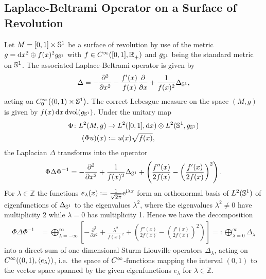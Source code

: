 \subsection{Laplace-Beltrami Operator on a Surface of Revolution}
\label{sec:laplace-beltrami}
Let $M = [0,1]\times\Sphere{1}$ be a surface of revolution by use of the metric
$g = \mathrm dx^2 \oplus f(x)^2 g_\Sphere{1}$ with $f\in \Cinf([0,1], \Rplus)$
and $g_\Sphere1$ being the standard metric on $\Sphere1$. The associated
Laplace-Beltrami operator is given by
\begin{align}
  \Delta = -\frac{\partial^2}{\partial x^2} -
            \frac{f'(x)}{f(x)}\frac{\partial}{\partial x} +
            \frac{1}{f(x)^2}\Delta_\Sphere1,
  \label{eqn:laplace}
\end{align}
acting on $\Cinf[0]\bigl((0,1)\times\Sphere1\bigr)$. The correct Lebesgue
measure on the space $(M,g)$ is given by $f(x)\,\mathrm dx\, \mathrm
d\!\vol(g_\Sphere1)$. Under the unitary map
\begin{align*}
  \Phi\colon L^2(M, g)&\to L^2([0,1], \mathrm dx)\otimes L^2(\Sphere1,
  g_\Sphere1) \\ (\Phi u)(x) &:= u(x) \sqrt{f(x)},
\end{align*}
the Laplacian $\Delta$ transforms into the operator
\begin{align*}
  \Phi\Delta\Phi^{-1} = -\frac{\partial^2}{\partial x^2} +
  \frac{1}{f(x)^2}\Delta_\Sphere1 + \left( \frac{f''(x)}{2f(x)} -
  \left(\frac{f'(x)}{2f(x)}\right)^2\right).
\end{align*}
For $\lambda\in\mathbb{Z}$ the functions $e_\lambda(x) :=
\frac{1}{\sqrt{2\pi}}\Eto{\mathrm i\lambda x}$ form an orthonormal basis of
$L^2(\Sphere1)$ of eigenfunctions of $\Delta_\Sphere1$ to the eigenvalues
$\lambda^2$, where the eigenvalues $\lambda^2 \neq 0$ have multiplicity 2 while
$\lambda = 0$ has multiplicity 1. Hence we have the decomposition
\begin{align}
  \label{eqn:lpl-decomp}
  \Phi\Delta\Phi^{-1} &= \bigoplus_{\lambda=-\infty}^{\infty} \left[
    -\frac{\partial^2}{\partial x^2} + \frac{\lambda^2}{f(x)^2} + 
     \left( \frac{f''(x)}{2f(x)} -
   \left(\frac{f'(x)}{2f(x)}\right)^2\right)\right]
     =: \bigoplus_{\lambda=0}^{\infty}\Delta_\lambda
\end{align}
into a direct sum of one-dimensional Sturm-Liouville operators $\Delta_\lambda$,
acting on $\Cinf((0,1),\langle e_\lambda\rangle)$, i.e.\ the space of
$\Cinf$-functions mapping the interval $(0,1)$ to the vector space spanned by
the given eigenfunctions $e_\lambda$ for $\lambda\in\mathbb{Z}$.

